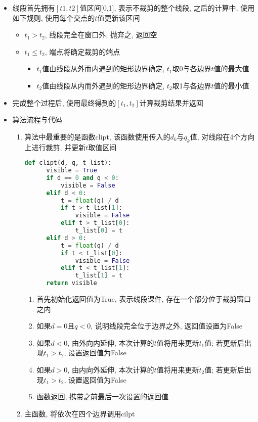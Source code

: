 \documentclass[a4paper,UTF8]{article}
\theoremstyle{definition}
\begin{document}
\begin{itemize}
  \item 线段首先拥有$[t1,t2]$值区间[0,1], 表示不裁剪的整个线段, 之后的计算中, 使用如下规则, 使用每个交点的$t$值更新该区间\begin{itemize}
    \item $t_1>t_2$, 线段完全在窗口外, 抛弃之, 返回空
    \item $t_1\leq t_2$, 端点将确定裁剪的端点\begin{itemize}
      \item $t_1$值由线段从外而内遇到的矩形边界确定, $t_1$取0与各边界$t$值的最大值
      \item $t_2$值由线段从内而外遇到的矩形边界确定, $t_2$取1与各边界$t$值的最小值
    \end{itemize}
  \end{itemize}
  \item 完成整个过程后, 使用最终得到的$[t_1, t_2]$计算裁剪结果并返回
  \item 算法流程与代码\begin{enumerate}
    \item 算法中最重要的是函数clipt, 该函数使用传入的$d_k$与$q_k$值, 对线段在4个方向上进行裁剪, 并更新$t$取值区间
    \begin{lstlisting}[language={Python}] 
  def clipt(d, q, t_list): 
      visible = True
      if d == 0 and q < 0:
          visible = False
      elif d < 0:
          t = float(q) / d
          if t > t_list[1]:
              visible = False
          elif t > t_list[0]:
              t_list[0] = t
      elif d > 0:
          t = float(q) / d
          if t < t_list[0]:
              visible = False
          elif t < t_list[1]:
              t_list[1] = t
      return visible\end{lstlisting}\begin{enumerate}
      \item 首先初始化返回值为True, 表示线段课件, 存在一个部分位于裁剪窗口之内
      \item 如果$d=0$且$q<0$, 说明线段完全位于边界之外, 返回值设置为False
      \item 如果$d<0$, 由外向内延伸, 本次计算的$t$值将用来更新$t_1$值; 若更新后出现$t_1>t_2$, 设置返回值为False
      \item 如果$d>0$, 由内向外延伸, 本次计算的$t$值将用来更新$t_2$值; 若更新后出现$t_1>t_2$, 设置返回值为False
      \item 函数返回, 携带之前最后一次设置的返回值
    \end{enumerate}
    \item 主函数, 将依次在四个边界调用cilpt\begin{itemize}

\end{itemize}
\end{enumerate}
\end{itemize}
\end{document}
